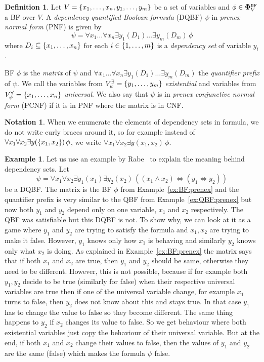 \documentclass[
  digital, %
  color,
  twoside, %
  table,   %
  nolof,     %
  nolot,     %
]{fithesis3}
\let\setbuilder\set
\newcommand{\simpleset}[1]{\{{#1}\}}
\renewcommand{\set}[1]{\normalexpandarg\IfSubStr{#1}{|}{\setbuilder{#1}}{\simpleset{#1}}}
\theoremstyle{definition}
\newtheorem{definition}{Definition}
\newtheorem{example}{Example}
\newtheorem*{notation}{Notation}
\theoremstyle{remark}
\newcommand{\BF}[1]{\mathbf{\Phi}_{#1}^{\normalfont{\text{\tiny BF}}}}
\newcommand{\evars}[1]{V_{#1}^{\exists}}
\newcommand{\uvars}[1]{V_{#1}^{\forall}}
\newcommand{\lequal}{\Leftrightarrow}
\newcommand{\itholds}{\,}
\begin{document}
\begin{definition}
  Let $V = \set{x_1, \dots, x_n, y_1, \dots, y_m}$ be a set of variables and $\phi \in \BF{V}$ a BF over $V$. A \emph{dependency quantified Boolean formula} (DQBF) $\psi$ in \emph{prenex normal form} (PNF) is given by
  \[\psi = \forall x_1 \dots \forall x_n \exists y_1 (D_1) \dots \exists y_m (D_m) \itholds \phi\]
  where $D_i \subseteq \set{x_1, \dots, x_n}$ for each $i \in \set{1,\dots,m}$ is a \emph{dependency set} of variable $y_i$.
  \label{def:DQBF:PNF}
\end{definition}
BF $\phi$ is the \emph{matrix} of $\psi$ and $\forall x_1 \dots \forall x_n \exists y_1 (D_1) \dots \exists y_m (D_m)$ the \emph{quantifier prefix} of $\psi$. We call the variables from $\evars{\psi} = \set{y_1,\dots,y_m}$ \emph{existential} and variables from $\uvars{\psi} = \set{x_1,\dots,x_n}$ \emph{universal}. We also say that $\psi$ is in \emph{prenex conjunctive normal form} (PCNF) if it is in PNF where the matrix is in CNF.

\begin{notation}
When we enumerate the elements of dependency sets in formula, we do not write curly braces around it, so for example instead of $\forall x_1 \forall x_2 \exists y (\set{x_1,x_2}) \itholds \phi$, we write $\forall x_1 \forall x_2 \exists y (x_1,x_2) \itholds \phi$.
\end{notation}

\begin{example}
Let us use an example by Rabe~\cite{DQBFProofSystem} to explain the meaning behind dependency sets. Let 
\[\psi = \forall x_1 \forall x_2 \exists y_1 (x_1) \exists y_2 (x_2) \itholds ((x_1 \land x_2) \lequal (y_1 \lequal y_2))\]
be a DQBF. The matrix is the BF $\phi$ from Example~\ref{ex:BF:prenex} and the quantifier prefix is very similar to the QBF from Example~\ref{ex:QBF:prenex} but now both $y_1$ and $y_2$ depend only on one variable, $x_1$ and $x_2$ respectively. The QBF was satisfiable but this DQBF is not. To show why, we can look at it as a game where $y_1$  and $y_2$ are trying to satisfy the formula and $x_1,x_2$ are trying to make it false. However, $y_1$ knows only how $x_1$ is behaving and similarly $y_2$ knows only what $x_2$ is doing. As explained in Example~\ref{ex:BF:prenex} the matrix says that if both $x_1$ and $x_2$ are true, then $y_1$ and $y_2$ should be same, otherwise they need to be different. However, this is not possible, because if for example both $y_1,y_2$ decide to be true (similarly for false) when their respective universal variables are true then if one of the universal variable change, for example $x_1$ turns to false, then $y_2$ does not know about this and stays true. In that case $y_1$ has to change the value to false so they become different. The same thing happens to $y_2$ if $x_2$ changes its value to false. So we get behaviour where both existential variables just copy the behaviour of their universal variable. But at the end, if both $x_1$ and $x_2$ change their values to false, then the values of $y_1$ and $y_2$ are the same (false) which makes the formula $\psi$ false.
\end{example}
\end{document}
